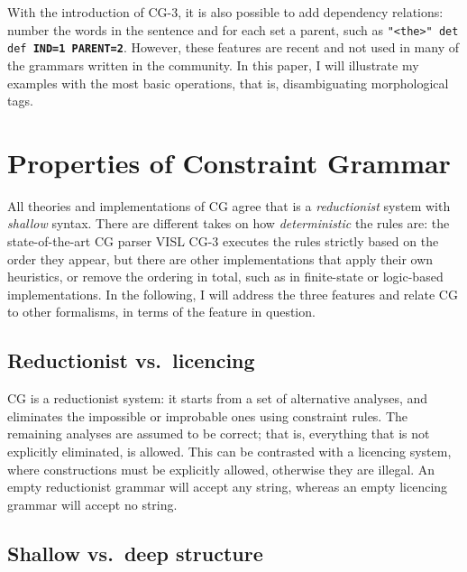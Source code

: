 With the introduction of CG-3, it is also possible to add dependency
relations: number the words in the sentence and for each set a parent,
such as \texttt{"<the>" det def  \textbf{IND=1 PARENT=2}}. However, these features
are recent and not used in many of the grammars written in the
community. In this paper, I will illustrate my examples with the most
basic operations, that is, disambiguating morphological tags.


\section*{Properties of Constraint
Grammar}\label{properties-of-constraint-grammar}

All theories and implementations of CG agree that is a \emph{reductionist}
system with \emph{shallow} syntax. There are different takes on how
\emph{deterministic} the rules are: the state-of-the-art CG parser VISL CG-3
executes the rules strictly based on the order they appear, but there
are other implementations that apply their own heuristics, or remove the
ordering in total, such as in finite-state or logic-based
implementations. In the following, I will address the three features and relate CG to
other formalisms, in terms of the feature in question.

\subsection*{Reductionist vs.~licencing}\label{reductionist-vs.licencing}

CG is a reductionist system: it starts from a set of alternative
analyses, and eliminates the impossible or improbable ones using
constraint rules. The remaining analyses are assumed to be correct; that
is, everything that is not explicitly eliminated, is allowed. This can
be contrasted with a licencing system, where constructions must
be explicitly allowed, otherwise they are illegal. An empty
reductionist grammar will accept any string, whereas an empty
licencing grammar will accept no string.

\subsection*{Shallow vs.~deep structure}\label{shallow-vs.deep-structure}

